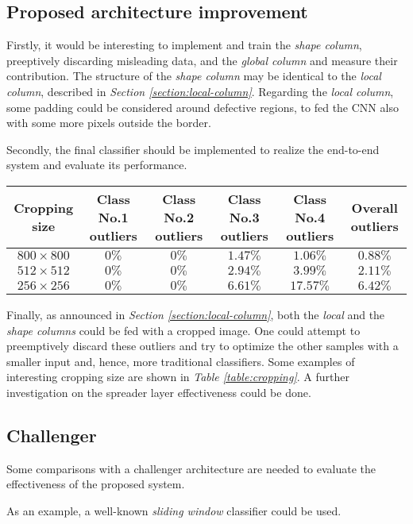 \subsection{Proposed architecture improvement}
\par{
	Firstly, it would be interesting to implement and train the \emph{shape column}, preeptively discarding misleading data, and the \emph{global column} and measure their contribution. The structure of the \emph{shape column} may be identical to the \emph{local column}, described in \emph{Section \ref{section:local-column}}. Regarding the \emph{local column}, some padding could be considered around defective regions, to fed the CNN also with some more pixels outside the border.
}
\par{
	Secondly, the final classifier should be implemented to realize the end-to-end system and evaluate its performance.
}
\begin{table*}
	\centering
	\normalsize
	\begin{tabular}{|c|c|c|c|c|c|}
		\hline
		\textbf{Cropping size} & \textbf{Class No.1 outliers} & \textbf{Class No.2 outliers}& \textbf{Class No.3 outliers} & \textbf{Class No.4 outliers} & \textbf{Overall outliers}\\\hline
		$800\times 800$ & $0\%$ & $0\%$ & $1.47\%$ & $1.06\%$ & $0.88\%$\\
		$512\times 512$ & $0\%$ & $0\%$ & $2.94\%$ & $3.99\%$ & $2.11\%$\\
		$256\times 256$ & $0\%$ & $0\%$ & $6.61\%$ & $17.57\%$& $6.42\%$\\
		\hline
	\end{tabular}
	\vspace{0.5cm}
	\caption{Cropping examples.}\label{table:cropping}
\end{table*}
\par{
	Finally, as announced in \emph{Section \ref{section:local-column}}, both the \emph{local} and the \emph{shape columns} could be fed with a cropped image. One could attempt to preemptively discard these outliers and try to optimize the other samples with a smaller input and, hence, more traditional classifiers. Some examples of interesting cropping size are shown in \emph{Table \ref{table:cropping}}. A further investigation on the spreader layer effectiveness could be done.
}
\subsection{Challenger}
\par{
	Some comparisons with a challenger architecture are needed to evaluate the effectiveness of the proposed system.
}
\par{
	As an example, a well-known \emph{sliding window} classifier could be used.
}
